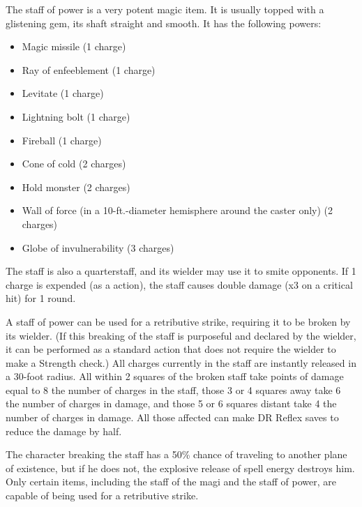 
 The staff of power is a very potent magic item. It is usually topped with a glistening gem, its shaft straight and smooth. It has the following powers:
\begin{itemize}
\item Magic missile (1 charge)
\item Ray of enfeeblement (1 charge)
\item Levitate (1 charge)
\item Lightning bolt (1 charge)
\item Fireball (1 charge)
\item Cone of cold (2 charges)
\item Hold monster (2 charges)
\item Wall of force (in a 10-ft.-diameter hemisphere around the caster only) (2 charges)
\item Globe of invulnerability (3 charges)
\end{itemize}

The staff is also a  quarterstaff, and its wielder may use it to smite opponents. If 1 charge is expended (as a  action), the staff causes double damage (x3 on a critical hit) for 1 round.

A staff of power can be used for a retributive strike, requiring it to be broken by its wielder. (If this breaking of the staff is purposeful and declared by the wielder, it can be performed as a standard action that does not require the wielder to make a Strength check.) All charges currently in the staff are instantly released in a 30-foot radius. All within 2 squares of the broken staff take points of damage equal to 8 \x the number of charges in the staff, those 3 or 4 squares away take 6 \x the number of charges in damage, and those 5 or 6 squares distant take 4 \x the number of charges in damage. All those affected can make DR  Reflex saves to reduce the damage by half.

The character breaking the staff has a 50\% chance of traveling to another plane of existence, but if he does not, the explosive release of spell energy destroys him. Only certain items, including the staff of the magi and the staff of power, are capable of being used for a retributive strike.

